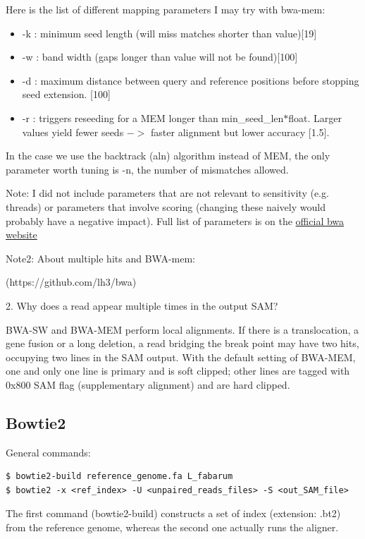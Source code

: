 \documentclass[10pt,a4paper]{report}
\begin{document}
Here is the list of different mapping parameters I may try with bwa-mem:
\begin{itemize}
\item -k : minimum seed length (will miss matches shorter than value)[19]
\item -w : band width (gaps longer than value will not be found)[100]
\item -d : maximum distance between query and reference positions before stopping seed extension. [100]
\item -r : triggers reseeding for a MEM longer than min\_seed\_len$*$float. Larger values yield fewer seeds $->$ faster alignment but lower accuracy [1.5].
\end{itemize}

In the case we use the backtrack (aln) algorithm instead of MEM, the only parameter worth tuning is -n, the number of mismatches allowed. 


Note: I did not include parameters that are not relevant to sensitivity (e.g. threads) or parameters that involve scoring (changing these naively would probably have a negative impact). Full list of parameters is on the \href{http://bio-bwa.sourceforge.net/bwa.shtml}{official bwa website}

Note2: About multiple hits and BWA-mem: 

(https://github.com/lh3/bwa)

2. Why does a read appear multiple times in the output SAM?

BWA-SW and BWA-MEM perform local alignments. If there is a translocation, a gene fusion or a long deletion, a read bridging the break point may have two hits, occupying two lines in the SAM output. With the default setting of BWA-MEM, one and only one line is primary and is soft clipped; other lines are tagged with 0x800 SAM flag (supplementary alignment) and are hard clipped.


\subsection{Bowtie2}
General commands: 
\begin{lstlisting}
$ bowtie2-build reference_genome.fa L_fabarum
$ bowtie2 -x <ref_index> -U <unpaired_reads_files> -S <out_SAM_file>
\end{lstlisting}
The first command (bowtie2-build) constructs a set of index (extension: .bt2) from the reference genome, whereas the second one actually runs the aligner.
\end{document}
